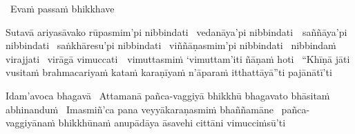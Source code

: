\begin{leader-pali}
  \anglebracketleft\ \hspace{-0.5mm}Evaṁ passaṁ bhikkhave \hspace{-0.5mm}\anglebracketright\
\end{leader-pali}
\begin{pali-hang-together}
  Sutavā ariyasāvako rūpasmim'pi nibbindati \breathmark\ vedanāya'pi \mbox{nibbindati}~\breathmark\ saññāya'pi nibbindati \breathmark\ saṅkhāresu'pi nibbindati \breathmark\ viññāṇasmim'pi nibbindati \breathmark\ nibbindaṁ virajjati \breathmark\ virāgā \mbox{vimuccati}~\breathmark\ vimuttasmiṁ `vimuttam'iti ñāṇaṁ hoti \breathmark\ ``Khīṇā jāti vusitaṁ brahmacariyaṁ kataṁ karaṇīyaṁ n'āparaṁ itthattāyā''ti pajānātī'ti
\end{pali-hang-together}

\ifafiveversion\clearpage\fi

\begin{pali-hang}
  Idam'avoca bhagavā \breathmark\ Attamanā pañca-vaggiyā bhikkhū bhagavato bhāsitaṁ abhinanduṁ \breathmark\ Imasmiñ'ca pana veyyākaraṇasmiṁ bhaññamāne \breathmark\ pañca-vaggiyānaṁ bhikkhūnaṁ anupādāya āsavehi cittāni vimucciṁsū'ti
\end{pali-hang}

\suttaRef{[SN 22.59]}

\ifdigitalversion{}\fi

